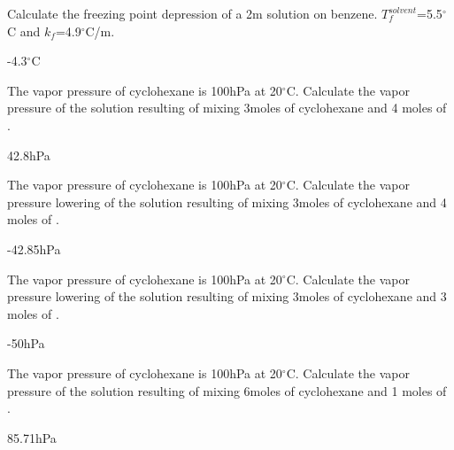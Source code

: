 \documentclass[main.tex]{subfiles}
\begin{document}
\begin{multicols*}{2}
\begin{question}[ID=\the\value{numA}]
Calculate the freezing point depression of a 2m  solution on benzene. $T^{solvent}_f$=5.5$^{\circ}$C and $k_f$=4.9$^{\circ}$C/m.
\end{question}
\begin{solution}
-4.3$^{\circ}$C
\hspace{0.1cm}\end{solution}%


\begin{question}[ID=\the\value{numA}]
The vapor pressure of cyclohexane is 100hPa at 20$^{\circ}$C. Calculate the vapor pressure of the solution resulting of mixing 3moles of cyclohexane and 4 moles of .
\end{question}
\begin{solution}
42.8hPa
\hspace{0.1cm}\end{solution}%

\begin{question}[ID=\the\value{numA}]
The vapor pressure of cyclohexane is 100hPa at 20$^{\circ}$C. Calculate the vapor pressure lowering of the solution resulting of mixing 3moles of cyclohexane and 4 moles of .
\end{question}
\begin{solution}
-42.85hPa
\hspace{0.1cm}\end{solution}%



\begin{question}[ID=\the\value{numA}]
The vapor pressure of cyclohexane is 100hPa at 20$^{\circ}$C. Calculate the vapor pressure lowering of the solution resulting of mixing 3moles of cyclohexane and 3 moles of .
\end{question}
\begin{solution}
-50hPa
\hspace{0.1cm}\end{solution}%


\begin{question}[ID=\the\value{numA}]
The vapor pressure of cyclohexane is 100hPa at 20$^{\circ}$C. Calculate the vapor pressure of the solution resulting of mixing 6moles of cyclohexane and 1 moles of .
\end{question}
\begin{solution}
85.71hPa
\hspace{0.1cm}\end{solution}%


\end{multicols*}
\end{document}
